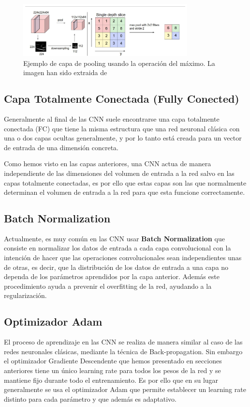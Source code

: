         \begin{figure}[!h]
            \centering
            \includegraphics[width=0.8\textwidth]{img/pooling.png}
            \caption{Ejemplo de capa de pooling usando la operación del máximo. La imagen han sido extraida de \cite{StanfordCourse}}
            \label{fig:pooling}
        \end{figure}
    
    \subsection{Capa Totalmente Conectada (Fully Conected)}
        \noindent Generalmente al final de las CNN suele encontrarse una capa totalmente conectada (FC) que tiene la misma estructura que una red neuronal clásica con una o dos capas ocultas generalmente, y por lo tanto está creada para un vector de entrada de una dimensión concreta.

        \medskip

        \noindent Como hemos visto en las capas anteriores, una CNN actua de manera independiente de las dimensiones del volumen de entrada a la red salvo en las capas totalmente conectadas, es por ello que estas capas son las que normalmente determinan el volumen de entrada a la red para que esta funcione correctamente.

    \subsection{Batch Normalization}
        \noindent Actualmente, es muy común en las CNN usar \textbf{Batch Normalization} que consiste en normalizar los datos de entrada a cada capa convolucional con la intención de hacer que las operaciones convolucionales sean independientes unas de otras, es decir, que la distribución de los datos de entrada a una capa no dependa de los parámetros aprendidos por la capa anterior. Además este procedimiento ayuda a prevenir el overfitting de la red, ayudando a la regularización.

    \subsection{Optimizador Adam}
        El proceso de aprendizaje en las CNN se realiza de manera similar al caso de las redes neuronales clásicas, mediante la técnica de Back-propagation. Sin embargo el optimizador Gradiente Descendente que hemos presentado en secciones anteriores tiene un único learning rate para todos los pesos de la red y se mantiene fijo durante todo el entrenamiento. Es por ello que en su lugar generalmente se usa el optimizador Adam que permite establecer un learning rate distinto para cada parámetro y que además es adaptativo.


